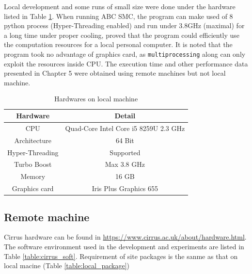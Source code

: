 Local development and some runs of small size were done under the hardware listed in Table \ref{table:local_hardware}. When running ABC SMC, the program can make used of 8 python process (Hyper-Threading enabled) and run under 3.8GHz (maximal) for a long time under proper cooling, proved that the program could efficiently use the computation resources for a local personal computer. It is noted that the program took no advantage of graphics card, as \verb|multiprocessing| along can only exploit the resources inside CPU. The execution time and other performance data presented in Chapter 5 were obtained using remote machines but not local machine.

\begin{table}
    \centering
    \begin{tabular}{|c c|}
        \hline
        Hardware        & Detail                                \\ [0.5ex]
        \hline\hline
        CPU             & Quad-Core Intel Core i5 8259U 2.3 GHz \\
        Architecture    & 64 Bit                                \\
        Hyper-Threading & Supported                             \\
        Turbo Boost     & Max 3.8 GHz                           \\
        Memory          & 16 GB                                 \\
        Graphics card   & Iris Plus Graphics 655                \\
        \hline
    \end{tabular}
    \caption{Hardwares on local machine}
    \label{table:local_hardware}
\end{table}



\subsection{Remote machine}

Cirrus hardware can be found in \url{https://www.cirrus.ac.uk/about/hardware.html}. The software environment used in the development and experiments are listed in Table \ref{table:cirrus_soft}. Requirement of site packages is the sanme as that on local macine (Table \ref{table:local_package})  

